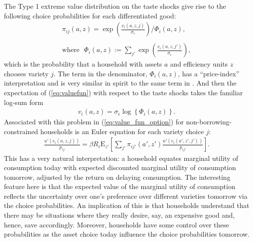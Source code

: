 \documentclass[12pt,pdftex]{article}
\begin{document}
\begin{onehalfspacing}
The Type 1 extreme value distribution on the taste shocks give rise to the following choice probabilities for each differentiated good:
\begin{align}
\pi_{ij}(a, z) = \exp \left( \frac{ v_{i}(a, z, j) }{\sigma_{\epsilon}} \right) \Bigg / \Phi_{i}(a,z), \label{eq:choice-prob} \\
\nonumber \\
\mbox{where} \ \ \ \Phi_{i}(a,z) := \sum_{j'} \exp \left( \frac{ v_{i}(a, z, j') }{\sigma_{\epsilon}} \right), \label{eq:big-phi}
\end{align}
which is the probability that a household with assets $a$ and efficiency units $z$ chooses variety $j$. The term in the denominator, $\Phi_{i}(a,z)$, has a ``price-index'' interpretation and is very similar in spirit to the same term in \citet{eaton2002technology}. And then the expectation of (\ref{eq:valuefun}) with respect to the taste shocks takes the familiar log-sum form
\begin{align}
v_i(a, z) = \sigma_{\epsilon} \log \left\{ \Phi_{i}(a,z)  \right\}. \label{eq:log_sum}
\end{align}
Associated with this problem in (\ref{eq:value_fun_option}) for non-borrowing-constrained households is an Euler equation for each variety choice $j$:
\begin{align}
\frac{u'(c_{i}(a, z, j))}{p_{ij}} = \beta R_{i} \mathrm{E}_{z'} \left[ \sum_{j'} \pi_{ij'}(a', z') \frac{u'(c_{i}(a', z', j'))}{p_{ij'}} \right].
\label{eq:euler_equation}
\end{align}
This has a very natural interpretation: a household equates marginal utility of consumption today with expected discounted marginal utility of consumption tomorrow, adjusted by the return on delaying consumption. The interesting feature here is that the expected value of the marginal utility of consumption reflects the uncertainty over one's preference over different varieties tomorrow via the choice probabilities. An implication of this is that households understand that there may be situations where they really desire, say, an expensive good and, hence, save accordingly. Moreover, households have some control over these probabilities as the asset choice today influence the choice probabilities tomorrow.


\end{onehalfspacing}
\end{document}
